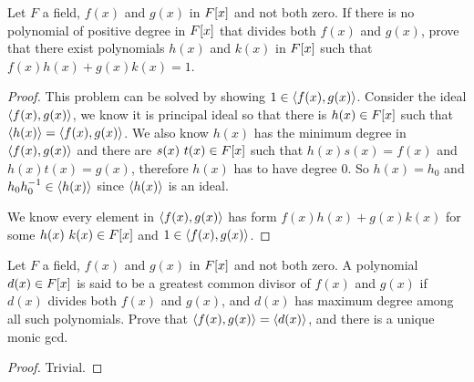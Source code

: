 \documentclass[../main.tex]{subfiles}
\begin{document}


\setcounter{exercise}{42}
\begin{exercise}
  Let $F$ a field, $f(x)$ and $g(x)$ in $F[x]$ and not both zero.
  If there is no polynomial of positive degree in $F[x]$ that divides
  both $f(x)$ and $g(x)$, prove that there exist polynomials $h(x)$ and $k(x)$
  in $F[x]$ such that $f(x)h(x) + g(x)k(x) = 1$.
\end{exercise}
\begin{proof}
  This problem can be solved by showing $1 \in \langle f(x), g(x) \rangle$.
  Consider the ideal $\langle f(x), g(x) \rangle$, we know it is principal ideal so that
  there is $h(x) \in F[x]$ such that $\langle h(x) \rangle = \langle f(x), g(x) \rangle$. We
  also know $h(x)$ has the minimum degree in $\langle f(x), g(x) \rangle$ and
  there are $s(x) \ t(x) \in F[x]$ such that $h(x)s(x) = f(x)$ and $h(x)t(x) = g(x)$,
  therefore $h(x)$ has to have degree $0$.
  So $h(x) = h_0$ and $h_0h_0^{-1} \in \langle h(x) \rangle$ since $\langle h(x) \rangle$ is an ideal.

  We know every element in $\langle f(x), g(x) \rangle$ has form $f(x)h(x) + g(x)k(x)$ for some
  $h(x) \ k(x) \in F[x]$ and $1 \in \langle f(x) , g(x) \rangle$.
\end{proof}

\begin{exercise}
  Let $F$ a field, $f(x)$ and $g(x)$ in $F[x]$ and not both zero.
  A polynomial $d(x) \in F[x]$ is said to be a greatest common divisor
  of $f(x)$ and $g(x)$ if $d(x)$ divides both $f(x)$ and $g(x)$,
  and $d(x)$ has maximum degree among all such polynomials.
  Prove that $\langle f(x), g(x) \rangle = \langle d(x) \rangle$, and there is a unique monic gcd.
\end{exercise}
\begin{proof}
  Trivial.
\end{proof}
\end{document}
